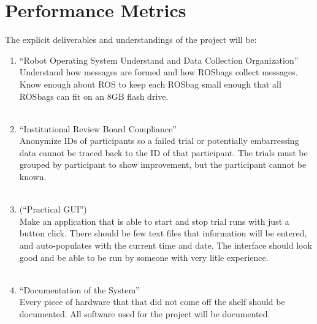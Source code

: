 \documentclass[onecolumn, draftclsnofoot,10pt, compsoc]{IEEEtran}
\begin{document}
\section{Performance Metrics}
	The explicit deliverables and understandings of the project will be:
\begin{enumerate}
	\item \large{“Robot Operating System Understand and Data Collection Organization”}
	\\
	\normalsize Understand how messages are formed and how ROSbags collect messages. Know enough about ROS to keep each ROSbag small enough that all ROSbags can fit on an 8GB flash drive.\\
	\\
	\item \large {“Institutional Review Board Compliance”}
	\\
	\normalsize Anonymize IDs of participants so a failed trial or potentially embarressing data cannot be traced back to the ID of that participant. The trials must be grouped by participant to show improvement, but the participant cannot be known.\\
	\\
	\item \large (“Practical GUI”)
	\\
	\normalsize Make an application that is able to start and stop trial runs with just a button click. There should be few text files that information will be entered, and auto-populates with the current time and date. The interface should look good and be able to be run by someone with very litle experience.\\
	\\
	\item \large{“Documentation of the System”}
	\\
	\normalsize Every piece of hardware that that did not come off the shelf should be documented. All software used for the project will be documented.\\
\end{enumerate}
\end{document}
